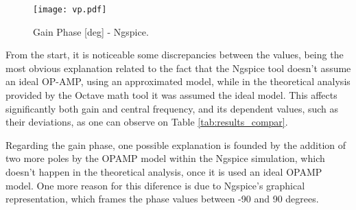 \begin{figure}[H] \centering
  \texttt{[image: vp.pdf]}
  \caption{Gain Phase [deg] - Ngspice.}
  \label{fig:vp_compar}
\end{figure}

\par From the start, it is noticeable some discrepancies between the values, being the most obvious explanation
related to the fact that the Ngspice tool doesn't assume an ideal OP-AMP, using an approximated model, while
in the theoretical analysis provided by the Octave math tool it was assumed the ideal model. This affects
significantly both gain and central frequency, and its dependent values, such as their deviations, as one can
observe on Table \ref{tab:results_compar}.
\par Regarding the gain phase, one possible explanation is founded by the addition of two more poles by the
OPAMP model within the Ngspice simulation, which doesn't happen in the theoretical analysis, once it is used
an ideal OPAMP model. One more reason for this diference is due to Ngspice's graphical representation, which
frames the phase values between -90 and 90 degrees.
